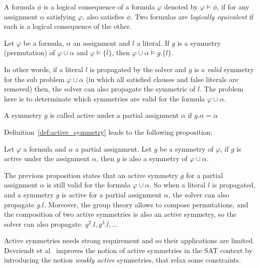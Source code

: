 \begin{definition}
 \label{def:logical_consequence}
 A formula $\phi$ is a logical consequence of a formula $\varphi$ denoted by $\varphi \models \phi$, if for any assignment
 $\alpha$ satisfying $\varphi$, also satisfies $\phi$. Two formulas are \emph{logically equivalent} if each is a logical
 consequence of the other.
\end{definition}
\begin{proposition}
 \label{prop:symmetry_propagation}
 Let $\varphi$ be a formula, $\alpha$ an assignment and $l$ a literal. 
 If $g$ is a symmetry (permutation) of $\varphi \cup \alpha$ and
 $\varphi \models \{l\}$, then $\varphi \cup \alpha \models g.\{l\}$.
\end{proposition}
In other words, if a literal $l$ is propagated by the solver and $g$ is a \emph{valid} symmetry for the
sub problem $\varphi \cup \alpha$ (in which all satisfied clauses and false literals are removed) then, the solver can
also propagate the symmetric of $l$. The problem here is to determinate which symmetries are valid for the formula
$\varphi \cup \alpha$.
\begin{definition}
 \label{def:active_symmetry}
 A symmetry $g$ is called active under a partial assignment $\alpha$ $\text{if } g.\alpha = \alpha$
\end{definition}
Definition~\ref{def:active_symmetry} leads to the following proposition:
\begin{proposition}
 \label{prop:active_symmetry}
 Let $\varphi$ a formula and $\alpha$ a partial assignment. Let $g$ be a symmetry of $\varphi$,
 if $g$ is active under the assignment $\alpha$, then $g$ is also a symmetry of $\varphi \cup \alpha$.
\end{proposition}
The previous proposition states that an active symmetry $g$ for a partial assignment $\alpha$ is still valid for
the formula $\varphi \cup \alpha$. So when a literal $l$ is propagated, and a symmetry $g$ is active for a
partial assignment $\alpha$, the solver can also propagate $g.l$. 
Moreover, the group theory allows to compose permutations, and the composition of two active symmetries is also an active symmetry,
so the solver can also propagate. $g^2.l, g^3.l, ... $



Active symmetries needs strong requirement and so their applications are limited.
Devriendt et al~\cite{Devriendt12} improves the notion of active symmetries in the SAT context by
introducing the notion \emph{weakly active} symmetries, that relax some constraints.

